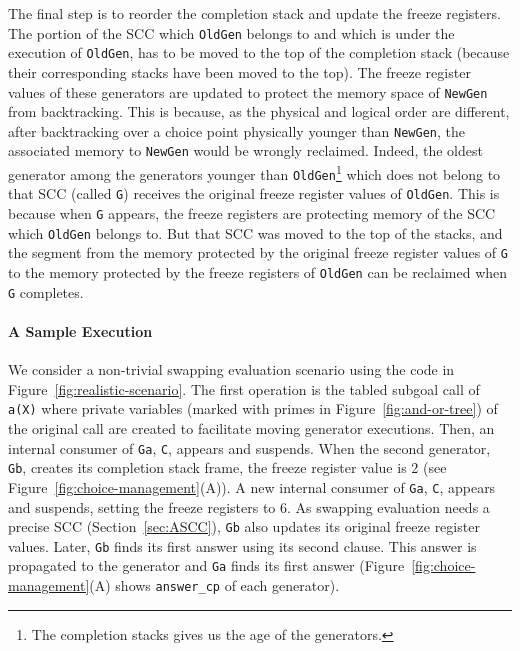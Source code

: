 \documentclass{./tlp}
\newcommand{\redsect}{\vspace{-1em}}
\begin{document}
The final step is to reorder the completion stack and update the
freeze registers.  The portion of the SCC which \lstinline{OldGen}
belongs to and which is under the execution of \lstinline{OldGen}, has
to be moved to the top of the completion stack (because their
corresponding stacks have been moved to the top).  The freeze register
values of these generators are updated to protect the memory space of
\lstinline{NewGen} from backtracking.  This is because, as the
physical and logical order are different, after backtracking over a
choice point physically younger than \lstinline{NewGen}, the
associated memory to \lstinline{NewGen} would be wrongly reclaimed.
Indeed, the oldest generator among the generators younger than
\lstinline{OldGen}\footnote{The completion stacks gives us the age of
  the generators.} which does not belong to that SCC (called
\lstinline{G}) receives the original freeze register values of
\lstinline{OldGen}.  This is because when \lstinline{G} appears,
the freeze registers are protecting memory of the SCC which
\lstinline{OldGen} belongs to.  But that SCC was moved to the top
of the stacks, 
and the segment from the memory protected by the original freeze
register values of \lstinline{G} to the memory protected by the freeze
registers of \lstinline{OldGen} can be reclaimed when \lstinline{G}
completes.









\redsect
\paragraph{\textbf{A Sample Execution}}
\label{sec:sample-exec}

We consider a non-trivial swapping evaluation scenario using the code
in Figure~\ref{fig:realistic-scenario}.  The first operation is the
tabled subgoal call of \lstinline{a(X)} where private variables
(marked with primes in Figure~\ref{fig:and-or-tree}) of the original
call are created to facilitate moving generator executions.  Then, an
internal consumer of \lstinline{Ga}, \lstinline{C},
appears and suspends. When the second generator, \lstinline{Gb},
creates its completion stack frame, the freeze register value is 2
(see Figure~\ref{fig:choice-management}(A)). A new internal consumer
of \lstinline{Ga}, \lstinline{C}, appears and
suspends, setting the freeze registers to 6. As swapping evaluation
needs a precise SCC (Section~\ref{sec:ASCC}), \lstinline{Gb} also
updates its original freeze register values. Later, \lstinline{Gb}
finds its first answer using its second clause. This answer is
propagated to the generator and \lstinline{Ga} finds its first answer
(Figure~\ref{fig:choice-management}(A) shows \lstinline{answer_cp} of
each generator).
\end{document}
